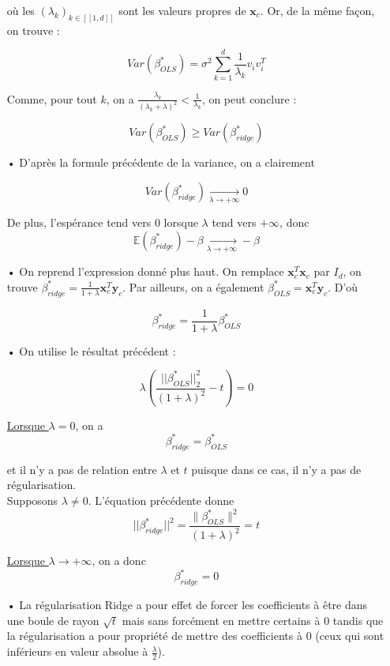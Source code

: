 \documentclass[a4paper, 10pt]{article}
\newcommand{\E}{\mathbb{E}}
\begin{document}
\begin{itemize}
où les $\left( \lambda_{k} \right)_{k \in [\![ 1, d ]\!]}$ sont les valeurs propres de $\textbf{x}_{c}$. Or, de la même façon, on trouve : 

\[ Var \left( \beta_{OLS}^{*} \right) = \sigma^{2} \sum_{k = 1}^{d} \frac{1}{\lambda_{k}} v_{i}v_{i}^{T} \]

Comme, pour tout $k$, on a $\frac{\lambda_{k}}{\left( \lambda_{k} + \lambda \right)^{2}} < \frac{1}{\lambda_{k}}$, on peut conclure :

\[  \boxed{Var \left( \beta_{OLS}^{*} \right) \geq Var \left( \beta_{ridge}^{*} \right)} \]

	\item[•] D'après la formule précédente de la variance, on a clairement 
	
\[ \boxed{Var \left( \beta_{ridge}^{*} \right) \underset{\lambda \longrightarrow + \infty}{\longrightarrow} 0} \]

De plus, l'espérance tend vers $0$ lorsque $\lambda$ tend vers $+ \infty$, donc \[ \boxed{\E \left( \beta_{ridge}^{*} \right) - \beta \underset{\lambda \longrightarrow + \infty}{\longrightarrow} - \beta} \]

	\item[•] On reprend l'expression donné plus haut. On remplace $\textbf{x}_{c}^{T}\textbf{x}_{c}$ par $I_{d}$, on trouve $\beta_{ridge}^{*} = \frac{1}{1 + \lambda}\textbf{x}_{c}^{T}\textbf{y}_{c}$. Par ailleurs, on a également $\beta_{OLS}^{*} = \textbf{x}_{c}^{T}\textbf{y}_{c}$. D'où
	
\[ \boxed{\beta_{ridge}^{*} = \frac{1}{1 + \lambda} \beta_{OLS}^{*}} \]

	\item[•] On utilise le résultat précédent :

\[ \lambda \left( \frac{||\beta_{OLS}^{*}||_{2}^{2}}{(1 + \lambda)^{2}} - t \right) = 0 \]

\underline{Lorsque $\lambda = 0$}, on a \[ \boxed{\beta_{ridge}^{*} = \beta_{OLS}^{*}} \] 

et il n'y a pas de relation entre $\lambda$ et $t$ puisque dans ce cas, il n'y a pas de régularisation. \\

Supposons $\lambda \neq 0$. L'équation précédente donne \[ || \beta_{ridge}^{*} ||^{2} = \frac{\|\beta_{OLS}^*\|^2}{(1 + \lambda)^2} = t \] 

\underline{Lorsque $\lambda \longrightarrow + \infty$}, on a donc \[ \boxed{\beta_{ridge}^{*} = 0} \]

	\item[•] La régularisation Ridge a pour effet de forcer les coefficients à être dans une boule de rayon $\sqrt{t}$ mais sans forcément en mettre certains à $0$ tandis que la régularisation a pour propriété de mettre des coefficients à $0$ (ceux qui sont inférieurs en valeur absolue à $\frac{\lambda}{2}$).

\end{itemize}	
	
\end{document}

